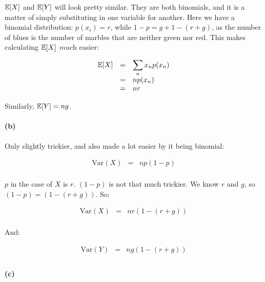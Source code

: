 \documentclass[a4paper]{article}
\begin{document}
$\mathbb{E}[X]$ and $\mathbb{E}[Y]$ will look pretty similar. They are both binomials, and it is a matter of simply substituting in one variable for another. Here we have a binomial distribution: $p(x_i) = r$, while $1-p = g+1-(r+g)$, as the number of blues is the number of marbles that are neither green nor red. This makes calculating $\mathbb{E}[X]$ $\textit{much}$ easier:

\begin{equation}
\begin{array}{rll}
\mathbb{E}[X] & = & \displaystyle\sum\limits_{n} x_n p(x_n) \\
& = & np(x_n) \\
& = & nr \\
\end{array}
\end{equation}

Similarly, $\mathbb{E}[Y] = ng$.

\paragraph{(b)}

Only slightly trickier, and also made a lot easier by it being binomial:

\begin{equation}
\begin{array}{rll}
\mbox{Var}(X) & = & np(1-p) \\
\end{array}
\end{equation}

$p$ in the case of $X$ is $r$. $(1-p)$ is not that much trickier. We know $r$ and $g$, so $(1-p) = (1-(r+g))$. So:

\begin{equation}
\begin{array}{rll}
\mbox{Var}(X) & = & nr(1-(r+g)) \\
\end{array}
\end{equation}

And:

\begin{equation}
\begin{array}{rll}
\mbox{Var}(Y) & = & ng(1-(r+g)) \\
\end{array}
\end{equation}

\paragraph{(c)}
\end{document}

